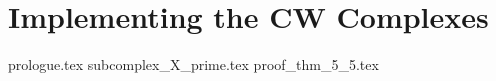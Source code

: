 \documentclass[class=article, crop=false]{standalone}
\begin{document}
\chapter{Implementing the CW Complexes}	

{prologue.tex}
{subcomplex_X_prime.tex}
{proof_thm_5_5.tex}
\end{document}
